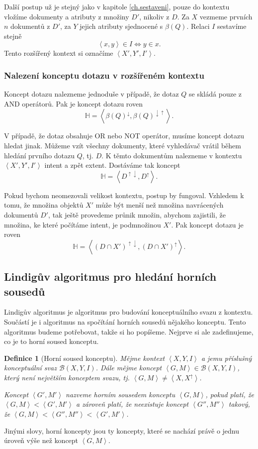 \documentclass[12pt]{article}
\newcommand{\ssection}[1]{\subsection{#1}}
\newcommand{\sssection}[1]{\subsubsection{#1}}
\newcommand{\addsp}[1]{\left<#1\right>}
\newcommand{\context}{\addsp{X, Y, I}}
\newcommand{\lattice}{\mathcal{B}(X, Y, I)}
\newcommand{\up}{^{\uparrow}}
\newcommand{\down}{^{\downarrow}}
\newcommand{\updown}{^{\uparrow\downarrow}}
\newcommand{\downup}{^{\downarrow\uparrow}}
\newcommand{\hledany}{\mathbb{H}}
\newtheorem{mydef}{Definice}
\begin{document}
Další postup už je stejný jako v kapitole \ref{ch.sestaveni}, pouze do kontextu vložíme dokumenty a atributy z množiny $D'$, nikoliv z $D$. Za $X$ vezmeme prvních $n$ dokumentů z $D'$, za $Y$ jejich atributy sjednocené s $\beta(Q)$. Relaci $I$ sestavíme stejně
$$
\addsp{x,y} \in I \iff y \in x.
$$
Tento rozšířený kontext si označíme $\addsp{X', Y', I'}$. 

\sssection{Nalezení konceptu dotazu v rozšířeném kontextu}
Koncept dotazu nalezneme jednoduše v případě, že dotaz $Q$ se skládá pouze z AND operátorů. Pak je koncept dotazu roven
$$
\hledany=\addsp{\beta(Q)\down, \beta(Q)\downup}.
$$

V případě, že dotaz obsahuje OR nebo NOT operátor, musíme koncept dotazu hledat jinak. Můžeme vzít všechny dokumenty, které vyhledávač vrátil během hledání prvního dotazu $Q$, tj. $D$. K těmto dokumentům nalezneme v kontextu $\addsp{X', Y', I'}$ intent a zpět extent. Dostáváme tak koncept
$$
\hledany=\addsp{D\updown, D\up}.
$$

Pokud bychom neomezovali velikost kontextu, postup by fungoval. Vzhledem k tomu, že množina objektů $X'$ může být menší než množina navrácených dokumentů $D'$, tak ještě provedeme průnik množin, abychom zajistili, že množina, ke které počítáme intent, je podmnožinou $X'$. Pak koncept dotazu je roven
$$
\hledany=\addsp{(D\cap X')\updown, (D\cap X')\up}.
$$

\ssection{Lindigův algoritmus pro hledání horních sousedů}
Lindigův algoritmus je algoritmus pro budování konceptuálního svazu z kontextu. Součástí je i algoritmus na spočítání horních sousedů nějakého konceptu. Tento algoritmus budeme potřebovat, takže si ho popíšeme. Nejprve si ale zadefinujeme, co je to horní soused konceptu. 

\begin{mydef}[Horní soused konceptu]
Mějme kontext $\context$ a jemu příslušný konceptuální svaz $\lattice$. Dále mějme koncept $\addsp{G, M} \in \lattice$, který není největším konceptem svazu, tj. $\addsp{G, M}\ne\addsp{X, X\up}$. 

Koncept $\addsp{G', M'}$ nazveme horním sousedem konceptu $\addsp{G, M}$, pokud platí, že $\addsp{G, M} < \addsp{G', M'}$ a zároveň platí, že neexistuje koncept $\addsp{G'', M''}$ takový, že $\addsp{G, M} < \addsp{G'', M''} < \addsp{G', M'}$.
\end{mydef}

Jinými slovy, horní koncepty jsou ty koncepty, které se nachází právě o jednu úroveň výše než koncept $\addsp{G, M}$.
\end{document}
